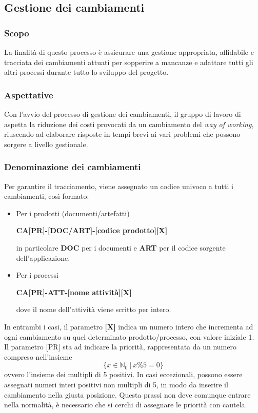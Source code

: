 \subsection{Gestione dei cambiamenti}
\subsubsection{Scopo}
La finalità di questo processo è assicurare una gestione appropriata, affidabile e tracciata
dei cambiamenti attuati per sopperire a mancanze e adattare tutti gli altri processi durante tutto lo sviluppo del progetto.

\subsubsection{Aspettative}
Con l'avvio del processo di gestione dei cambiamenti, il gruppo di lavoro di aspetta la riduzione dei costi provocati da un cambiamento
del \textit{way of working}, riuscendo ad elaborare risposte in tempi brevi ai vari problemi che possono sorgere a livello gestionale.

\subsubsection{Denominazione dei cambiamenti}
Per garantire il tracciamento, viene assegnato un codice univoco a tutti i cambiamenti, così formato:
\begin{itemize}
    \item Per i prodotti (documenti/artefatti)
        \begin{center}
            \textbf{CA[PR]-[DOC/ART]-[codice prodotto][X]}
        \end{center}
        in particolare \textbf{DOC} per i documenti e \textbf{ART} per il codice sorgente dell'applicazione.
    \item Per i processi
        \begin{center}
            \textbf{CA[PR]-ATT-[nome attività][X]}
        \end{center}
        dove il nome dell'attività viene scritto per intero.
\end{itemize}
In entrambi i casi, il parametro \textbf{[X]} indica un numero intero che incrementa ad ogni cambiamento su quel determinato prodotto/processo,
 con valore iniziale 1.\\
 Il parametro \textbf[PR] sta ad indicare la priorità, rappresentata da un numero compreso nell'insieme
 \[\{x \in \mathbb{N}_0 \ | \  x \% 5 = 0 \} \]
 ovvero l'insieme dei multipli di 5 positivi. In casi eccezionali, possono essere assegnati numeri interi positivi non multipli di 5,
 in modo da inserire il cambiamento nella giusta posizione. Questa prassi non deve comunque entrare nella normalità, è necessario che si cerchi
 di assegnare le priorità con cautela.

